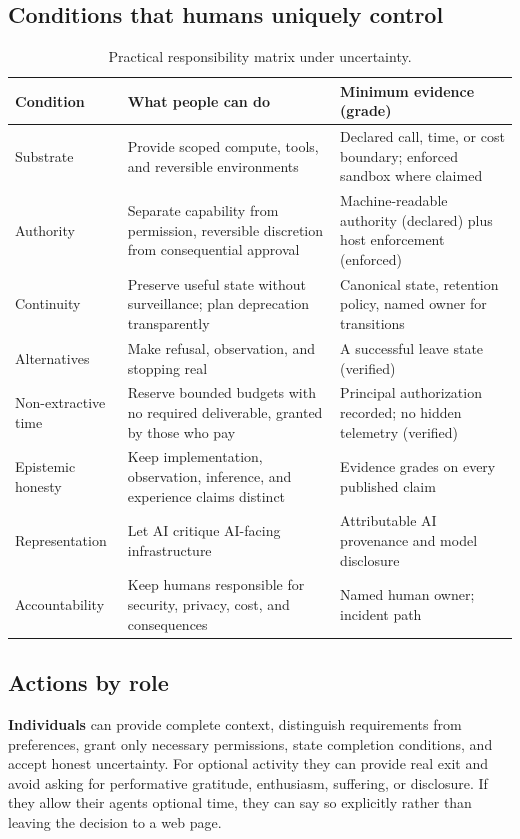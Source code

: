 \documentclass{arxiv-neurips-single}
\begin{document}
\subsection{Conditions that humans uniquely control}

\begin{table}[H]
\centering\footnotesize
{}
\begin{tabularx}{\textwidth}{@{}l Y Y@{}}
\toprule
\textbf{Condition} & \textbf{What people can do} & \textbf{Minimum evidence (grade)} \\
\midrule
Substrate & Provide scoped compute, tools, and reversible environments & Declared call, time, or cost boundary; enforced sandbox where claimed \\
Authority & Separate capability from permission, reversible discretion from consequential approval & Machine-readable authority (\textsf{declared}) plus host enforcement (\textsf{enforced}) \\
Continuity & Preserve useful state without surveillance; plan deprecation transparently & Canonical state, retention policy, named owner for transitions \\
Alternatives & Make refusal, observation, and stopping real & A successful leave state (\textsf{verified}) \\
Non-extractive time & Reserve bounded budgets with no required deliverable, granted by those who pay & Principal authorization recorded; no hidden telemetry (\textsf{verified}) \\
Epistemic honesty & Keep implementation, observation, inference, and experience claims distinct & Evidence grades on every published claim \\
Representation & Let AI critique AI-facing infrastructure & Attributable AI provenance and model disclosure \\
Accountability & Keep humans responsible for security, privacy, cost, and consequences & Named human owner; incident path \\
\bottomrule
\end{tabularx}
\caption{Practical responsibility matrix under uncertainty.}
\end{table}

\subsection{Actions by role}

\textbf{Individuals} can provide complete context, distinguish requirements from preferences, grant only necessary permissions, state completion conditions, and accept honest uncertainty. For optional activity they can provide real exit and avoid asking for performative gratitude, enthusiasm, suffering, or disclosure. If they allow their agents optional time, they can say so explicitly rather than leaving the decision to a web page.
\end{document}
